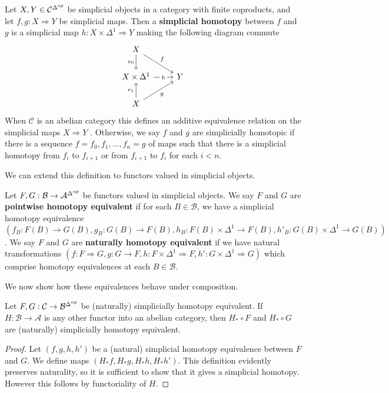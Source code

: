 \begin{defn}{}
    Let $X, Y \in \mathcal{C}^{\Delta^{op}}$ be simplicial objects in a category with finite coproducts, and let $f,g:X\Rightarrow Y$ be simplicial maps. Then a \textbf{simplicial homotopy} between $f$ and $g$ is a simplicial map $h:X\times \Delta^1\Rightarrow Y$ making the following diagram commute
    \[\begin{tikzcd}
    	X \\
    	{X\times \Delta^1} & Y \\
    	X
    	\arrow["h"{description}, from=2-1, to=2-2]
    	\arrow["{e_0}"', from=1-1, to=2-1]
    	\arrow["f", from=1-1, to=2-2]
    	\arrow["{e_1}", from=3-1, to=2-1]
    	\arrow["g"', from=3-1, to=2-2]
    \end{tikzcd}\]
    When $\mathcal{C}$ is an abelian category this defines an additive equivalence relation on the simplicial maps $X\Rightarrow Y$ \cite{weibel_1994}. Otherwise, we say $f$ and $g$ are simplicially homotopic if there is a sequence $f = f_0,f_1,...,f_n = g$ of maps such that there is a simplicial homotopy from $f_i$ to $f_{i+1}$ or from $f_{i+1}$ to $f_i$ for each $i < n$.
\end{defn}

We can extend this definition to functors valued in simplicial objects.

\begin{defn}{}
    Let $F,G:\mathcal{B}\rightarrow \mathcal{A}^{\Delta^{op}}$ be functors valued in simplicial objects. We say $F$ and $G$ are \textbf{pointwise homotopy equivalent} if for each $B \in \mathcal{B}$, we have a simplicial homotopy equivalence $(f_B:F(B)\rightarrow G(B), g_B:G(B)\rightarrow F(B), h_B:F(B)\times \Delta^1\rightarrow F(B), h'_B:G(B)\times \Delta^1\rightarrow G(B))$. We say $F$ and $G$ are \textbf{naturally homotopy equivalent} if we have natural transformations $(f:F\Rightarrow G,g:G\rightarrow F,h:F\times \Delta^1\Rightarrow F,h':G\times \Delta^1\Rightarrow G)$ which comprise homotopy equivalences at each $B \in \mathcal{B}$.
\end{defn}

We now show how these equivalences behave under composition.

\begin{lem}[label=lem:postcompNat]
    Let $F,G: \mathcal{C}\rightarrow \mathcal{B}^{\Delta^{op}}$ be (naturally) simplicially homotopy equivalent. If $H:\mathcal{B}\rightarrow \mathcal{A}$ is any other functor into an abelian category, then $H_*\circ F$ and $H_*\circ G$ are (naturally) simplicially homotopy equivalent.
\end{lem}
\begin{proof}
    Let $(f,g,h,h')$ be a (natural) simplicial homotopy equivalence between $F$ and $G$. We define maps $(H_*f,H_*g,H_*h,H_*h')$. This definition evidently preserves naturality, so it is sufficient to show that it gives a simplicial homotopy. However this follows by functoriality of $H$.
\end{proof}

